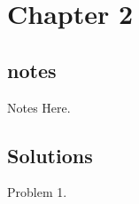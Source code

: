 \documentclass[12pt,twoside,notitlepage]{article}
\begin{document}
\section{Chapter 2}

\subsection{notes}

Notes Here.

\subsection{Solutions}

Problem 1. 
\end{document}
